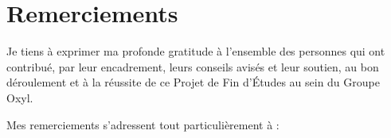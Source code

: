 \documentclass{tnreport}
\begin{document}
\maketitle
{}


\cleardoublepage



\cleardoublepage

\makesecondtitle

\section*{Remerciements}

Je tiens à exprimer ma profonde gratitude à l'ensemble des personnes qui ont contribué, par leur encadrement, leurs conseils avisés et leur soutien, au bon déroulement et à la réussite de ce Projet de Fin d'Études au sein du Groupe Oxyl.

Mes remerciements s'adressent tout particulièrement à :
\end{document}
